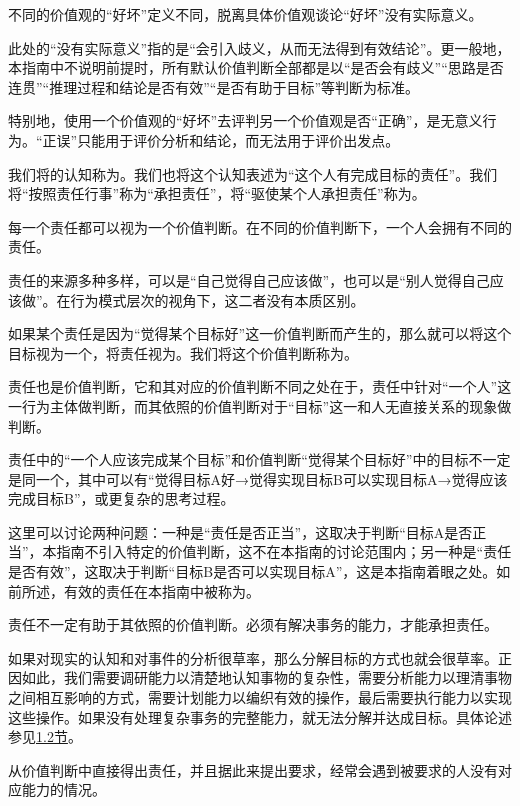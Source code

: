 不同的价值观的“好坏”定义不同，脱离具体价值观谈论“好坏”没有实际意义。
\begin{explain}
此处的“没有实际意义”指的是“会引入歧义，从而无法得到有效结论”。更一般地，本指南中不说明前提时，所有默认价值判断全部都是以“是否会有歧义”“思路是否连贯”“推理过程和结论是否有效”“是否有助于目标”等判断为标准。

特别地，使用一个价值观的“好坏”去评判另一个价值观是否“正确”，是无意义行为。“正误”只能用于评价分析和结论，而无法用于评价出发点。
\end{explain}

我们将的认知称为。我们也将这个认知表述为“这个人有完成目标的责任”。我们将“按照责任行事”称为“承担责任”，将“驱使某个人承担责任”称为。
\begin{explain}
每一个责任都可以视为一个价值判断。在不同的价值判断下，一个人会拥有不同的责任。

责任的来源多种多样，可以是“自己觉得自己应该做”，也可以是“别人觉得自己应该做”。在行为模式层次的视角下，这二者没有本质区别。
\end{explain}
如果某个责任是因为“觉得某个目标好”这一价值判断而产生的，那么就可以将这个目标视为一个，将责任视为。我们将这个价值判断称为。
\begin{explain}
责任也是价值判断，它和其对应的价值判断不同之处在于，责任中针对“一个人”这一行为主体做判断，而其依照的价值判断对于“目标”这一和人无直接关系的现象做判断。

责任中的“一个人应该完成某个目标”和价值判断“觉得某个目标好”中的目标不一定是同一个，其中可以有“觉得目标A好→觉得实现目标B可以实现目标A→觉得应该完成目标B”，或更复杂的思考过程。

这里可以讨论两种问题：一种是“责任是否正当”，这取决于判断“目标A是否正当”，本指南不引入特定的价值判断，这不在本指南的讨论范围内；另一种是“责任是否有效”，这取决于判断“目标B是否可以实现目标A”，这是本指南着眼之处。如前所述，有效的责任在本指南中被称为。
\end{explain}
责任不一定有助于其依照的价值判断。必须有解决事务的能力，才能承担责任。
\begin{explain}
如果对现实的认知和对事件的分析很草率，那么分解目标的方式也就会很草率。正因如此，我们需要调研能力以清楚地认知事物的复杂性，需要分析能力以理清事物之间相互影响的方式，需要计划能力以编织有效的操作，最后需要执行能力以实现这些操作。如果没有处理复杂事务的完整能力，就无法分解并达成目标。具体论述参见\hyperref[sec:现实事务处理能力]{1.2节}。

从价值判断中直接得出责任，并且据此来提出要求，经常会遇到被要求的人没有对应能力的情况。
\end{explain}
